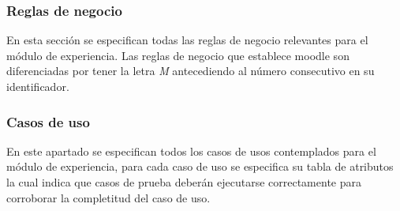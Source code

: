 

%
\subsubsection{Reglas de negocio} %

 En esta sección se especifican todas las reglas de negocio relevantes para el módulo de
 experiencia. Las reglas de negocio que establece moodle son diferenciadas por tener la letra {\it M}
 antecediendo al número consecutivo en su identificador.



\clearpage
\subsubsection{Casos de uso} %

 En este apartado se especifican todos los casos de usos contemplados para el módulo de
 experiencia, para cada caso de uso se especifica su tabla de atributos la cual indica que casos
 de prueba deberán ejecutarse correctamente para corroborar la completitud del caso de uso.

